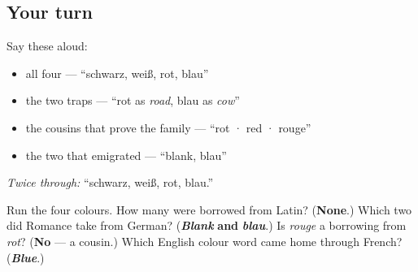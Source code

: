 \subsection*{Your turn}
Say these aloud:

\begin{itemize}
\raggedright
  \item all four — \textquotedblleft{}schwarz, weiß, rot, blau\textquotedblright{}
  \item the two traps — \textquotedblleft{}rot as \emph{road}, blau as \emph{cow}\textquotedblright{}
  \item the cousins that prove the family — \textquotedblleft{}rot · red · rouge\textquotedblright{}
  \item the two that emigrated — \textquotedblleft{}blank, blau\textquotedblright{}
\end{itemize}

\emph{Twice through:} \textquotedblleft{}schwarz, weiß, rot, blau.\textquotedblright{}

\begin{tcolorbox}[breakable,colback=teal!4,colframe=teal!35!black,title={Before you move on}]
Run the four colours. How many were borrowed from Latin? (\textbf{None}.) Which two did Romance take from German? (\emph{\textbf{Blank}} \textbf{and} \emph{\textbf{blau}}.) Is \emph{rouge} a borrowing from \emph{rot}? (\textbf{No} — a cousin.) Which English colour word came home through French? (\emph{\textbf{Blue}}.)
\end{tcolorbox}
